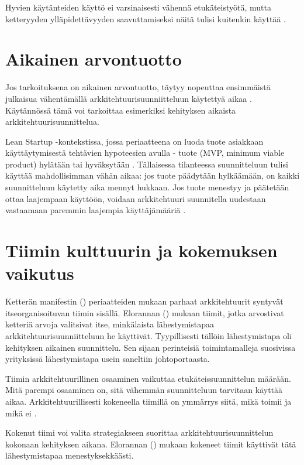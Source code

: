 Hyvien käytänteiden käyttö ei varsinaisesti vähennä etukäteistyötä, mutta ketteryyden ylläpidettävyyden saavuttamiseksi näitä tulisi kuitenkin käyttää \citep{waterman_agility_2018_a}. 

\section{Aikainen arvontuotto}

Jos tarkoituksena on aikainen arvontuotto, täytyy nopeuttaa ensimmäistä julkaisua vähentämällä arkkitehtuurisuunniitteluun käytettyä aikaa \citep{waterman_how_2015}. Käytännössä tämä voi tarkoittaa esimerkiksi kehityksen aikaista arkkitehtuurisuunnittelua.

Lean Startup -kontekstissa, jossa periaatteena on luoda tuote  asiakkaan käyttäytymisestä tehtävien hypoteesien avulla - tuote (MVP, minimum viable product) hylätään tai hyväksytään \citep{reis2011lean}. Tällaisessa tilanteessa suunnitteluun tulisi käyttää mahdollisimman vähän aikaa: jos tuote päädytään hylkäämään, on kaikki suunnitteluun käytetty aika mennyt hukkaan. Jos tuote menestyy ja päätetään ottaa laajempaan käyttöön, voidaan arkkitehtuuri suunnitella uudestaan vastaamaan paremmin laajempia käyttäjämääriä \citep{reis2011lean}.

\section{Tiimin kulttuurin ja kokemuksen vaikutus}

Ketterän manifestin (\citeyear{fowler2001agile}) periaatteiden mukaan parhaat arkkitehtuurit syntyvät itseorganisoituvan tiimin sisällä.
Elorannan (\citeyear{eloranta2015techniques}) mukaan tiimit, jotka arvostivat ketteriä arvoja valitsivat itse, minkälaista lähestymistapaa arkkitehtuurisuunniitteluun he käyttivät. Tyypillisesti tällöin lähestymistapa oli kehityksen aikainen suunnittelu. Sen sijaan perinteisiä toimintamalleja suosivissa yrityksissä lähestymistapa usein saneltiin johtoportaasta. 

Tiimin arkkitehtuurillinen osaaminen vaikuttaa etukäteissuunnittelun määrään. Mitä parempi osaaminen on, sitä vähemmän suunnitteluun tarvitaan käyttää aikaa. Arkkitehtuurillisesti kokeneella tiimillä on ymmärrys siitä, mikä toimii ja mikä ei \citep{waterman_how_2015}.

Kokenut tiimi voi valita strategiakseen suorittaa arkkitehtuurisuunnittelun kokonaan kehityksen aikana. Elorannan (\citeyear{eloranta2015techniques}) mukaan kokeneet tiimit käyttivät tätä lähestymistapaa menestyksekkäästi.

